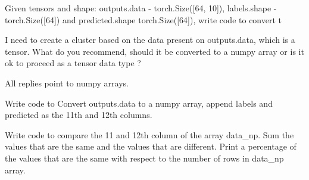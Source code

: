 
Given tensors and shape: outputs.data - torch.Size([64, 10]), labels.shape - torch.Size([64]) and predicted.shape torch.Size([64]), write code to convert t

I need to create a cluster based on the data present on outputs.data, which is a tensor. What do you recommend, should it be converted to a numpy array or is it ok to proceed as a tensor data type ?

All replies point to numpy arrays.


Write code to Convert outputs.data to a numpy array, append labels and predicted as the 11th and 12th columns.







Write code to compare the 11 and 12th column of the array data\_np. Sum the values that are the same and the values that are different. Print a percentage of the values that are the same with respect to the number of rows in data\_np array.